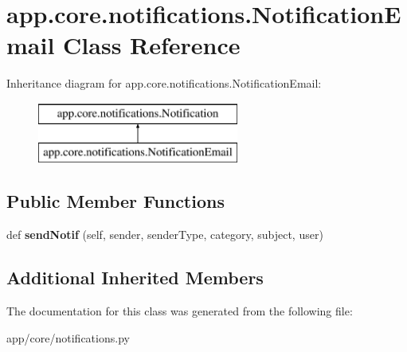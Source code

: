 \hypertarget{classapp_1_1core_1_1notifications_1_1_notification_email}{}\section{app.\+core.\+notifications.\+Notification\+Email Class Reference}
\label{classapp_1_1core_1_1notifications_1_1_notification_email}
Inheritance diagram for app.\+core.\+notifications.\+Notification\+Email\+:\begin{figure}[H]
\begin{center}
\leavevmode
\includegraphics[height=2.000000cm]{classapp_1_1core_1_1notifications_1_1_notification_email}
\end{center}
\end{figure}
\subsection*{Public Member Functions}
\begin{DoxyCompactItemize}
\item 
\mbox{\label{classapp_1_1core_1_1notifications_1_1_notification_email_a424965780c2bc73b29b01c576532e04e}} 
def {\bfseries send\+Notif} (self, sender, sender\+Type, category, subject, user)
\end{DoxyCompactItemize}
\subsection*{Additional Inherited Members}


The documentation for this class was generated from the following file\+:\begin{DoxyCompactItemize}
\item 
app/core/notifications.\+py\end{DoxyCompactItemize}
